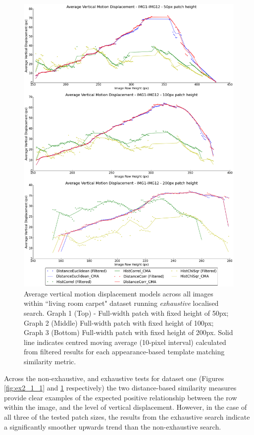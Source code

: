 \clearpage
\begin{figure}[ht!]
\centering
\includegraphics[scale=0.3]{images/results/flat_10cm_non_scaled_exhaustive}
\caption{Average vertical motion displacement models across all images within ``living room carpet" dataset running \textit{exhaustive} localised search. Graph 1 (Top) - Full-width patch with fixed height of 50px; Graph 2 (Middle) Full-width patch with fixed height of 100px; Graph 3 (Bottom) Full-width patch with fixed height of 200px. Solid line indicates centred moving average (10-pixel interval) calculated from filtered results for each appearance-based template matching similarity metric.}
\label{fig:ex2_1_2}
\end{figure}

Across the non-exhaustive, and exhaustive tests for dataset one (Figures \ref{fig:ex2_1_1} and \ref{fig:ex2_1_2} respectively) the two distance-based similarity measures provide clear examples of the expected positive relationship between the row within the image, and the level of vertical displacement. However, in the case of all three of the tested patch sizes, the results from the exhaustive search indicate a significantly smoother upwards trend than the non-exhaustive search.

